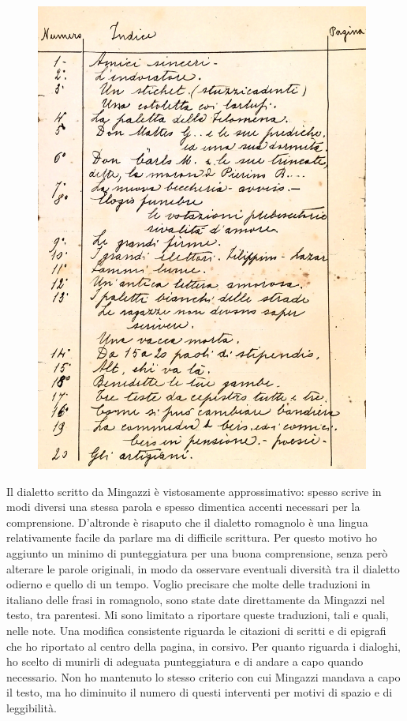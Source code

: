  \begin{figure}[htb]
    \centering
    \vspace{-0.7cm}
    \includegraphics[width=0.98\textwidth]{indice}
\end{figure}
\newpage
\noindent Il dialetto scritto da Mingazzi è vistosamente approssimativo: spesso scrive in modi diversi una stessa parola e spesso dimentica accenti necessari per la comprensione. D'altronde è risaputo che il dialetto romagnolo è una lingua relativamente facile da parlare ma di difficile scrittura. Per questo motivo ho aggiunto un minimo di punteggiatura per una buona comprensione, senza però alterare le parole originali, in modo da osservare eventuali diversità tra il dialetto odierno e quello di un tempo. Voglio precisare che molte delle traduzioni in italiano delle frasi in romagnolo, sono state date direttamente da Mingazzi nel testo, tra parentesi. Mi sono limitato a riportare queste traduzioni, tali e quali, nelle note. Una modifica consistente riguarda le citazioni di scritti e di epigrafi che ho riportato al centro della pagina, in corsivo. Per quanto riguarda i dialoghi, ho scelto di munirli di adeguata punteggiatura e di andare a capo quando necessario. Non ho mantenuto lo stesso criterio con cui Mingazzi mandava a capo il testo, ma ho diminuito il numero di questi interventi per motivi di spazio e di leggibilità.	\\\\
